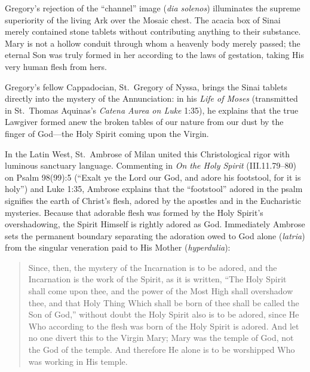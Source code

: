 Gregory's rejection of the ``channel'' image (\textit{dia solenos}) illuminates the supreme superiority of the living Ark over the Mosaic chest. The acacia box of Sinai merely contained stone tablets without contributing anything to their substance. Mary is not a hollow conduit through whom a heavenly body merely passed; the eternal Son was truly formed in her according to the laws of gestation, taking His very human flesh from hers.

Gregory's fellow Cappadocian, St.\ Gregory of Nyssa, brings the Sinai tablets directly into the mystery of the Annunciation: in his \textit{Life of Moses} (transmitted in St.\ Thomas Aquinas's \textit{Catena Aurea on Luke} 1:35), he explains that the true Lawgiver formed anew the broken tables of our nature from our dust by the finger of God---the Holy Spirit coming upon the Virgin.

In the Latin West, St.\ Ambrose of Milan united this Christological rigor with luminous sanctuary language. Commenting in \textit{On the Holy Spirit} (III.11.79--80) on Psalm 98(99):5 (``Exalt ye the Lord our God, and adore his footstool, for it is holy'') and Luke 1:35, Ambrose explains that the ``footstool'' adored in the psalm signifies the earth of Christ's flesh, adored by the apostles and in the Eucharistic mysteries. Because that adorable flesh was formed by the Holy Spirit's overshadowing, the Spirit Himself is rightly adored as God. Immediately Ambrose sets the permanent boundary separating the adoration owed to God alone (\textit{latria}) from the singular veneration paid to His Mother (\textit{hyperdulia}):

\begin{quote}\small
Since, then, the mystery of the Incarnation is to be adored, and the Incarnation is the work of the Spirit, as it is written, ``The Holy Spirit shall come upon thee, and the power of the Most High shall overshadow thee, and that Holy Thing Which shall be born of thee shall be called the Son of God,'' without doubt the Holy Spirit also is to be adored, since He Who according to the flesh was born of the Holy Spirit is adored. And let no one divert this to the Virgin Mary; Mary was the temple of God, not the God of the temple. And therefore He alone is to be worshipped Who was working in His temple.
\end{quote}

